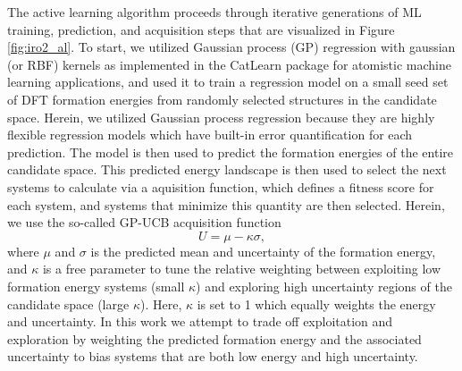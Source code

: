 %
%
The active learning algorithm proceeds through iterative generations of ML training, prediction, and acquisition steps that are visualized in Figure \ref{fig:iro2_al}.
%
To start, we utilized Gaussian process (GP) regression with gaussian (or RBF) kernels as implemented in the CatLearn\cite{hansen2019atomistic,CatLearn_Repo} package for atomistic machine learning applications, and used it to train a regression model on a small seed set of DFT formation energies from randomly selected structures in the candidate space.
%
Herein, we utilized Gaussian process regression because they are highly flexible regression models which have built-in error quantification for each prediction.
%
The model is then used to predict the formation energies of the entire candidate space.
%
This predicted energy landscape is then used to select the next systems to calculate via a aquisition function, which defines a fitness score for each system, and systems that minimize this quantity are then selected.
%
Herein, we use the so-called GP-UCB acquisition function
%
\begin{equation}
    U = \mu - \kappa \sigma,
\end{equation}
%
where $\mu$ and $\sigma$ is the predicted mean and uncertainty of the formation energy,
and $\kappa$ is a free parameter to tune the relative weighting between exploiting low formation energy systems (small $\kappa$) and exploring high uncertainty regions of the candidate space (large $\kappa$).
%
Here, $\kappa$ is set to \num{1} which equally weights the energy and uncertainty.
%
In this work we attempt to trade off exploitation and exploration by weighting the predicted formation energy and the associated uncertainty to bias systems that are both low energy and high uncertainty.
%
